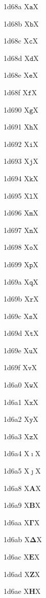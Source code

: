 \documentclass[11pt]{article}
\begin{document}
1d68a X{\ensuremath{\mathtt{a}}}X

1d68b X{\ensuremath{\mathtt{b}}}X

1d68c X{\ensuremath{\mathtt{c}}}X

1d68d X{\ensuremath{\mathtt{d}}}X

1d68e X{\ensuremath{\mathtt{e}}}X

1d68f X{\ensuremath{\mathtt{f}}}X

1d690 X{\ensuremath{\mathtt{g}}}X

1d691 X{\ensuremath{\mathtt{h}}}X

1d692 X{\ensuremath{\mathtt{i}}}X

1d693 X{\ensuremath{\mathtt{j}}}X

1d694 X{\ensuremath{\mathtt{k}}}X

1d695 X{\ensuremath{\mathtt{l}}}X

1d696 X{\ensuremath{\mathtt{m}}}X

1d697 X{\ensuremath{\mathtt{n}}}X

1d698 X{\ensuremath{\mathtt{o}}}X

1d699 X{\ensuremath{\mathtt{p}}}X

1d69a X{\ensuremath{\mathtt{q}}}X

1d69b X{\ensuremath{\mathtt{r}}}X

1d69c X{\ensuremath{\mathtt{s}}}X

1d69d X{\ensuremath{\mathtt{t}}}X

1d69e X{\ensuremath{\mathtt{u}}}X

1d69f X{\ensuremath{\mathtt{v}}}X

1d6a0 X{\ensuremath{\mathtt{w}}}X

1d6a1 X{\ensuremath{\mathtt{x}}}X

1d6a2 X{\ensuremath{\mathtt{y}}}X

1d6a3 X{\ensuremath{\mathtt{z}}}X

1d6a4 X{\ensuremath{\imath}}X

1d6a5 X{\ensuremath{\jmath}}X

1d6a8 X{\ensuremath{\mathbf{A}}}X

1d6a9 X{\ensuremath{\mathbf{B}}}X

1d6aa X{\ensuremath{\mathbf{\Gamma}}}X

1d6ab X{\ensuremath{\mathbf{\Delta}}}X

1d6ac X{\ensuremath{\mathbf{E}}}X

1d6ad X{\ensuremath{\mathbf{Z}}}X

1d6ae X{\ensuremath{\mathbf{H}}}X
\end{document}
